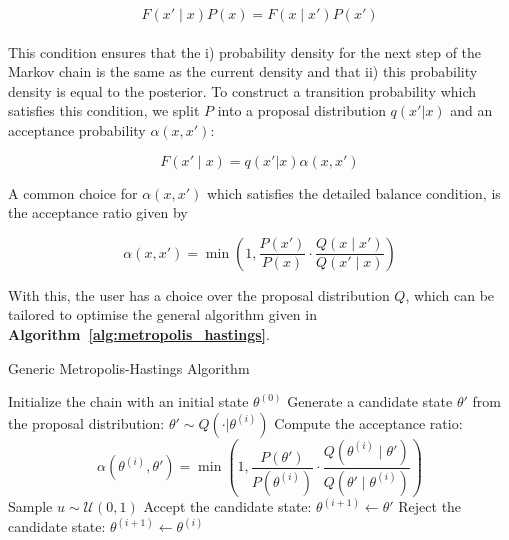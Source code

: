 \documentclass{article}
\begin{document}
\begin{equation}
\label{eq:db}
F(x' \mid x)P(x)=  F(x\mid x')P(x')
\end{equation}

\paragraph{}This condition ensures that the i) probability density for the next step of the Markov chain is the same as the current density and that ii) this probability density is equal to the posterior.  To construct a transition probability which satisfies this condition, we split $P$ into a proposal distribution $q(x' | x)$ and an acceptance probability $\alpha(x, x')$:

\begin{equation}
F(x' \mid x) = q(x' | x)\alpha(x, x')
\end{equation}

A common choice for $\alpha(x, x')$ which satisfies the detailed balance condition, is the acceptance ratio given by 

\begin{equation}
\label{eq:alpha}
        \alpha(x, x') = \min\left(1, \frac{P(x')}{P(x)} \cdot \frac{Q(x \mid x')}{Q(x' \mid x)}\right)
 \end{equation}

With this, the user has a choice over the proposal distribution $Q$, which can be tailored to optimise the general algorithm given in \textbf{Algorithm~\ref{alg:metropolis_hastings}}.

\begin{algorithm}[H]
\caption{Generic Metropolis-Hastings Algorithm}
\label{alg:metropolis_hastings}
\begin{algorithmic}[1]
    \State Initialize the chain with an initial state $\theta^{(0)}$
        \State Generate a candidate state $\theta'$ from the proposal distribution: $\theta' \sim Q(\cdot | \theta^{(i)})$
        \State Compute the acceptance ratio:
        \[
        \alpha(\theta^{(i)}, \theta') = \min\left(1, \frac{P(\theta')}{P(\theta^{(i)})} \cdot \frac{Q(\theta^{(i)} \mid \theta')}{Q(\theta' \mid \theta^{(i)})}\right)
        \]
        \State Sample $u \sim \mathcal{U}(0, 1)$
            \State Accept the candidate state: $\theta^{(i+1)} \leftarrow \theta'$
        \Else
            \State Reject the candidate state: $\theta^{(i+1)} \leftarrow \theta^{(i)}$
        \EndIf
    \EndFor
\end{algorithmic}
\end{algorithm}
\end{document}
